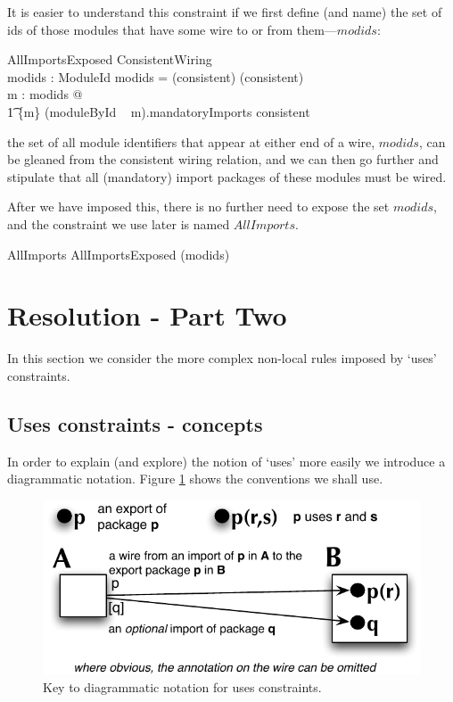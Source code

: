 \documentclass[a4paper,12pt]{article}
\begin{document}
It is easier to understand this constraint if we first define (and name) the set of ids of those modules that have some wire to or from them---$modids$:
\begin{schema}{AllImportsExposed}
	ConsistentWiring \\
	modids : \power ModuleId
\where
	modids = \dom (\ran consistent) \cup \dom (\dom consistent) \\
	\forall m : modids @ \\
	\t1	 \{m\} \cross (moduleById ~ m).mandatoryImports \subseteq \dom consistent
\end{schema}
the set of all module identifiers that appear at either end of a wire, $modids$, can be gleaned from the consistent wiring relation, and we can then go further and stipulate that all (mandatory) import packages of these modules must be wired.

After we have imposed this, there is no further need to expose the set $modids$, and the constraint we use later is named $AllImports$.
\begin{zed}
	AllImports  AllImportsExposed \hide (modids)
\end{zed}

\clearpage
\section{Resolution - Part Two}
In this section we consider the more complex non-local rules imposed by `uses' constraints.

\subsection{Uses constraints - concepts}
In order to explain (and explore)  the notion of `uses' more easily we introduce a diagrammatic notation. Figure \ref{fig:key} shows the conventions we shall use.

\begin{figure}[h]
\centering
\includegraphics*[scale=0.7]{keydiag.pdf}
\caption[Key to diagrams]{Key to diagrammatic notation for uses constraints.}
\label{fig:key}
\end{figure}
\end{document}
